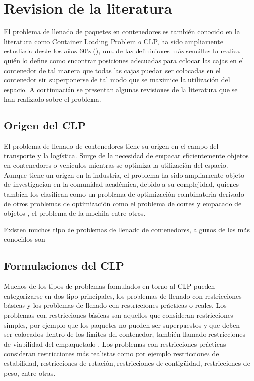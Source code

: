 
\section{Revision de la literatura}

El problema de llenado de paquetes en contenedores es también conocido en la literatura como Container Loading Problem o CLP, ha sido ampliamente estudiado desde los años 60's (\textcite{barnett1967exact}), una de las definiciones más sencillas lo realiza \textcite{GEORGE1980147} quién lo define como encontrar posiciones adecuadas para colocar las cajas en el contenedor de tal manera que todas las cajas puedan ser colocadas en el contenedor sin superponerse de tal modo que se maximice la utilización del espacio. A continuación se presentan algunas revisiones de la literatura que se han realizado sobre el problema.

\subsection{Origen del CLP}

El problema de llenado de contenedores tiene su origen en el campo del transporte y la logística. Surge de la necesidad de empacar eficientemente objetos en contenedores o vehículos mientras se optimiza la utilización del espacio. Aunque tiene un origen en la industria, el problema ha sido ampliamente objeto de investigación en la comunidad académica, debido a su complejidad, quienes también los clasifican como un problema de optimización combinatoria derivado de otros problemas de optimización como el problema de cortes y empacado de objetos \textcite{Alvarez-Valdes2018}, el problema de la mochila \textcite{DEQUEIROZ2012200} entre otros.

Existen muchos tipo de problemas de llenado de contenedores, algunos de los más conocidos son:

\subsection{Formulaciones del CLP}

Muchos de los tipos de problemas formulados en torno al CLP pueden categorizarse en dos tipo principales, los problemas de llenado con restricciones básicas y los problemas de llenado con restricciones prácticas o reales. Los problemas con restricciones básicas son aquellos que consideran restricciones simples, por ejemplo que los paquetes no pueden ser superpuestos y que deben ser colocados dentro de los límites del contenedor, también llamado restricciones de viabilidad del empaquetado \textcite{scheithauer2017introduction}. Los problemas con restricciones prácticas consideran restricciones más realistas como por ejemplo restricciones de estabilidad, restricciones de rotación, restricciones de contigüidad, restricciones de peso, entre otras. 

